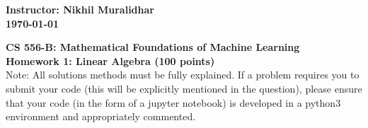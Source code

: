 \documentclass{article}%
\begin{document}
\begin{flushleft}
\textbf{Instructor: Nikhil Muralidhar \\
\today}
\end{flushleft}

\begin{center}
\textbf{\Large CS 556-B: Mathematical Foundations of Machine Learning \\
Homework 1: Linear Algebra (100 points)} \\
\vspace{2ex}
Note: All solutions methods must be fully explained. If a problem requires you to submit your code (this will be explicitly mentioned in the question), please ensure that your code (in the form of a jupyter notebook) is developed in a python3 environment and appropriately commented.
\end{center}
\end{document}
